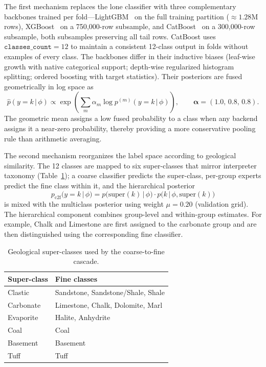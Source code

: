 \documentclass[bdcc,article,submit,pdftex,moreauthors]{Definitions/mdpi}
\begin{document}
The first mechanism replaces the lone classifier with three complementary backbones trained
per fold---LightGBM~\cite{ke2017lightgbm} on the full training partition ($\approx\!1.28$M rows),
XGBoost~\cite{chen2016xgboost} on a 750{,}000-row subsample, and
CatBoost~\cite{prokhorenkova2018catboost} on a 300{,}000-row subsample, both subsamples
preserving all tail rows. CatBoost uses $\texttt{classes\_count}=12$ to maintain a consistent
12-class output in folds without examples of every class. The backbones differ in their
inductive biases (leaf-wise growth with
native categorical support; depth-wise regularized histogram splitting; ordered boosting with
target statistics). Their posteriors are fused geometrically in log space as
\begin{equation}
\hat p(y=k\,|\,\phi)\propto\exp\!\left(\sum_m \alpha_m\log p^{(m)}(y=k\,|\,\phi)\right),\qquad
\boldsymbol\alpha=(1.0,\,0.8,\,0.8).
\label{eq:geomean}
\end{equation}
The geometric mean assigns a low fused probability to a class when any backend assigns it a
near-zero probability, thereby providing a more conservative pooling rule than arithmetic
averaging.

The second mechanism reorganizes the label space according to geological similarity. The 12
classes are mapped to six super-classes that mirror interpreter taxonomy
(Table~\ref{tab:superclass}); a coarse classifier predicts the super-class, per-group experts
predict the fine class within it, and the hierarchical posterior
\begin{equation}
p_\text{c2f}(y=k\,|\,\phi) = p\!\bigl(\text{super}(k)\,|\,\phi\bigr)\cdot p\!\bigl(k\,|\,\phi,\text{super}(k)\bigr)
\label{eq:c2f}
\end{equation}
is mixed with the multiclass posterior using weight $\mu=0.20$ (validation grid). The
hierarchical component combines group-level and within-group estimates. For example, Chalk
and Limestone are first assigned to the carbonate group and are then distinguished using the
corresponding fine classifier.

\begin{table}[H]
\caption{Geological super-classes used by the coarse-to-fine cascade.\label{tab:superclass}}
\begin{tabularx}{\textwidth}{lX}
\toprule
\textbf{Super-class} & \textbf{Fine classes}\\
\midrule
Clastic & Sandstone, Sandstone/Shale, Shale\\
Carbonate & Limestone, Chalk, Dolomite, Marl\\
Evaporite & Halite, Anhydrite\\
Coal & Coal\\
Basement & Basement\\
Tuff & Tuff\\
\bottomrule
\end{tabularx}
\end{table}
\end{document}
